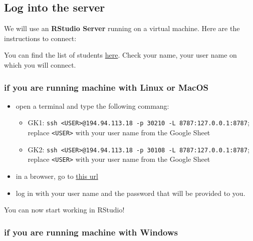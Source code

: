 \documentclass[
]{book}
\providecommand{\tightlist}{%
  \setlength{\itemsep}{0pt}\setlength{\parskip}{0pt}}
\begin{document}
\hypertarget{log-into-the-server}{%
\subsection*{Log into the server}\label{log-into-the-server}}

We will use an \textbf{RStudio Server} running on a virtual machine.
Here are the instructions to connect:

You can find the list of students \href{https://docs.google.com/spreadsheets/d/1eMCr4b6UcOPIG8tJkfoEkMoZzJycWJPMYN5nMZWiU48/edit?usp=sharing}{here}.
Check your name, your user name on which you will connect.

\hypertarget{if-you-are-running-machine-with-linux-or-macos}{%
\subsubsection*{if you are running machine with Linux or MacOS}\label{if-you-are-running-machine-with-linux-or-macos}}

\begin{itemize}
\tightlist
\item
  open a terminal and type the following commang:

  \begin{itemize}
  \tightlist
  \item
    GK1: \texttt{ssh\ \textless{}USER\textgreater{}@194.94.113.18\ -p\ 30210\ -L\ 8787:127.0.0.1:8787}; replace \texttt{\textless{}USER\textgreater{}} with your user name from the Google Sheet
  \item
    GK2: \texttt{ssh\ \textless{}USER\textgreater{}@194.94.113.18\ -p\ 30108\ -L\ 8787:127.0.0.1:8787}; replace \texttt{\textless{}USER\textgreater{}} with your user name from the Google Sheet
  \end{itemize}
\item
  in a browser, go to \href{http://127.0.0.1:8787}{this url}
\item
  log in with your user name and the password that will be provided to you.
\end{itemize}

You can now start working in RStudio!

\hypertarget{if-you-are-running-machine-with-windows}{%
\subsubsection*{if you are running machine with Windows}\label{if-you-are-running-machine-with-windows}}
\end{document}

